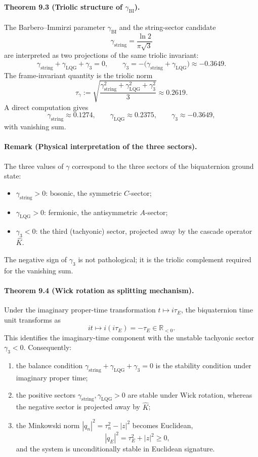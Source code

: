 \paragraph*{Theorem 9.3 (Triolic structure of $\gamma_{\mathrm{BI}}$).}
The Barbero--Immirzi parameter $\gamma_{\mathrm{BI}}$ and the string-sector candidate
\[
\gamma_{\mathrm{string}} = \frac{\ln 2}{\pi\sqrt{3}}
\]
are interpreted as two projections of the same triolic invariant:
\[
\gamma_{\mathrm{string}} + \gamma_{\mathrm{LQG}} + \gamma_3 = 0,
\qquad
\gamma_3 = -\bigl(\gamma_{\mathrm{string}} + \gamma_{\mathrm{LQG}}\bigr) \approx -0.3649.
\]
The frame-invariant quantity is the triolic norm
\[
\tau_\gamma := \sqrt{\frac{\gamma_{\mathrm{string}}^2 + \gamma_{\mathrm{LQG}}^2 + \gamma_3^2}{3}} \approx 0.2619.
\]
A direct computation gives
\[
\gamma_{\mathrm{string}} \approx 0.1274, \qquad \gamma_{\mathrm{LQG}} \approx 0.2375, \qquad \gamma_3 \approx -0.3649,
\]
with vanishing sum.

\paragraph*{Remark (Physical interpretation of the three sectors).}
The three values of $\gamma$ correspond to the three sectors of the biquaternion ground state:
\begin{itemize}
  \item $\gamma_{\mathrm{string}} > 0$: bosonic, the symmetric $C$-sector;
  \item $\gamma_{\mathrm{LQG}} > 0$: fermionic, the antisymmetric $A$-sector;
  \item $\gamma_3 < 0$: the third (tachyonic) sector, projected away by the cascade operator $\hat K$.
\end{itemize}
The negative sign of $\gamma_3$ is not pathological; it is the triolic complement required for the vanishing sum.

\paragraph*{Theorem 9.4 (Wick rotation as splitting mechanism).}
Under the imaginary proper-time transformation $t \mapsto i\tau_E$, the biquaternion time unit transforms as
\[
it \mapsto i(i\tau_E) = -\tau_E \in \mathbb{R}_{<0}.
\]
This identifies the imaginary-time component with the unstable tachyonic sector $\gamma_3<0$. Consequently:
\begin{enumerate}
  \item the balance condition $\gamma_{\mathrm{string}}+\gamma_{\mathrm{LQG}}+\gamma_3=0$ is the stability condition under imaginary proper time;
  \item the positive sectors $\gamma_{\mathrm{string}}, \gamma_{\mathrm{LQG}}>0$ are stable under Wick rotation, whereas the negative sector is projected away by $\hat K$;
  \item the Minkowski norm $|q_n|^2=\tau_n^2-|z|^2$ becomes Euclidean,
  \[
  |q_E|^2 = \tau_E^2 + |z|^2 \ge 0,
  \]
  and the system is unconditionally stable in Euclidean signature.
\end{enumerate}

